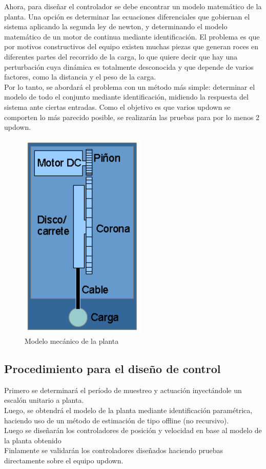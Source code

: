Ahora, para diseñar el controlador se debe encontrar un modelo matemático de la planta. Una opción es determinar las ecuaciones diferenciales que gobiernan el sistema aplicando la segunda ley de newton, y determinando el modelo matemático de un motor de continua mediante identificación. El problema es que por motivos constructivos del equipo existen muchas piezas que generan roces en diferentes partes del recorrido de la carga, lo que quiere decir que hay una perturbación cuya dinámica es totalmente desconocida y que depende de varios factores, como la distancia y el peso de la carga.\\
Por lo tanto, se abordará el problema con un método más simple: determinar el modelo de todo el conjunto mediante identificación, midiendo la respuesta del sistema ante ciertas entradas. Como el objetivo es que varios updown se comporten lo más parecido posible, se realizarán las pruebas para por lo menos 2 updown. 

\begin{figure}[!ht]
	\centering
	\includegraphics[width=6cm,scale=1]{resources/2_2-modeloMecPlanta.png}
	\caption{Modelo mecánico de la planta}
	\label{fig:\thefigure}
\end{figure}


\subsection{Procedimiento para el diseño de control}
Primero se determinará el período de muestreo y actuación inyectándole un escalón unitario a planta.\\
Luego, se obtendrá el modelo de la planta mediante identificación paramétrica, haciendo uso de un método de estimación de tipo offline (no recursivo).\\
Luego se diseñarán los controladores de posición y velocidad en base al modelo de la planta obtenido\\
Finlamente se validarán los controladores diseñados haciendo pruebas directamente sobre el equipo updown.

